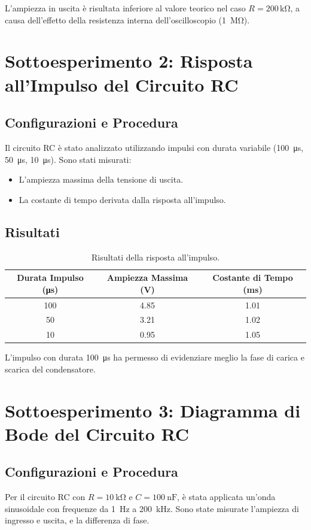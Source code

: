 \documentclass[a4paper,11pt]{article}
\begin{document}
L'ampiezza in uscita è risultata inferiore al valore teorico nel caso \( R = 200 \, \mathrm{k\Omega} \), a causa dell'effetto della resistenza interna dell'oscilloscopio (\SI{1}{\mega\ohm}).


\section{Sottoesperimento 2: Risposta all'Impulso del Circuito RC}
\subsection*{Configurazioni e Procedura}
Il circuito RC è stato analizzato utilizzando impulsi con durata variabile (\SI{100}{\micro\second}, \SI{50}{\micro\second}, \SI{10}{\micro\second}). Sono stati misurati:
\begin{itemize}
    \item L'ampiezza massima della tensione di uscita.
    \item La costante di tempo derivata dalla risposta all'impulso.
\end{itemize}

\subsection*{Risultati}
\begin{table}[H]
\centering
\begin{tabular}{|c|c|c|}
\hline
\textbf{Durata Impulso (\si{\micro\second})} & \textbf{Ampiezza Massima (\si{\volt})} & \textbf{Costante di Tempo (\si{\milli\second})} \\ \hline
100 & 4.85 & 1.01 \\ \hline
50 & 3.21 & 1.02 \\ \hline
10 & 0.95 & 1.05 \\ \hline
\end{tabular}
\caption{Risultati della risposta all’impulso.}
\end{table}

L'impulso con durata \SI{100}{\micro\second} ha permesso di evidenziare meglio la fase di carica e scarica del condensatore.


\section{Sottoesperimento 3: Diagramma di Bode del Circuito RC}
\subsection*{Configurazioni e Procedura}
Per il circuito RC con \( R = \SI{10}{\kilo\ohm} \) e \( C = \SI{100}{\nano\farad} \), è stata applicata un’onda sinusoidale con frequenze da \SI{1}{\hertz} a \SI{200}{\kilo\hertz}. Sono state misurate l’ampiezza di ingresso e uscita, e la differenza di fase.
\end{document}
